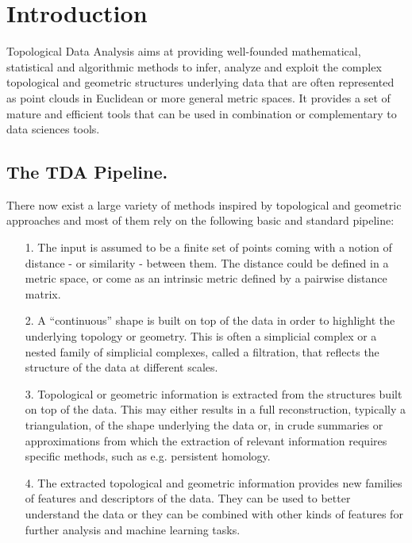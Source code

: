 \section{Introduction}
Topological Data Analysis aims at providing well-founded mathematical, statistical and algorithmic methods to infer, analyze and exploit the complex topological and geometric structures underlying data that are often represented as point clouds in Euclidean or more general metric spaces. It provides a set of mature and efficient tools that can be used in combination or complementary to data sciences tools.\cite{chazal2017introduction}
\subsection{The TDA Pipeline.}
There now exist a large variety of methods inspired by topological and geometric approaches and most of them rely on the following basic and standard pipeline:
\begin{enumerate}
    \item[1.]The input is assumed to be a finite set of points coming with a notion of distance - or similarity - between them. The distance could be defined in a metric space, or  come as an intrinsic metric defined by a pairwise distance matrix.
    \item[2.]A “continuous” shape is built on top of the data in order to highlight the underlying topology or geometry. This is often a simplicial complex or a nested family of simplicial complexes, called a filtration, that reflects the structure of the data at different scales.
    \item[3.]Topological or geometric information is extracted from the structures built on top of the data.  This may either results in a full reconstruction, typically a triangulation, of the shape underlying the data or, in crude summaries or approximations from which the extraction of relevant information requires specific methods, such as e.g. persistent homology.
    \item[4.]The extracted topological and geometric information provides new families of features and descriptors of the data. They can be used to better understand the data or they can be combined with other kinds of features for further analysis and machine learning tasks. 
\end{enumerate}
